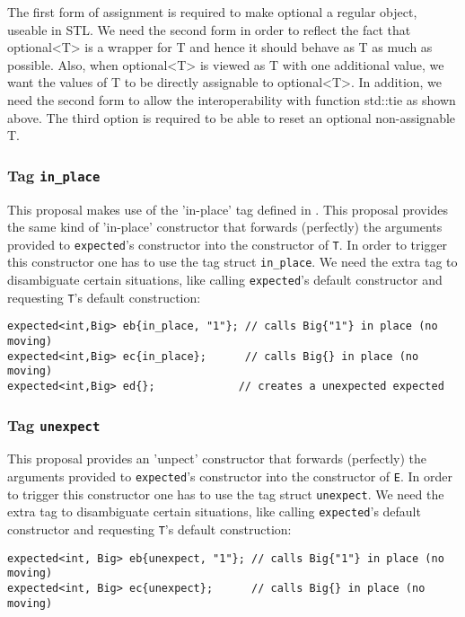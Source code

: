\documentclass[a4paper,10pt]{article}
\newcommand{\cpp}[1]{\lstinline{#1}}
\begin{document}
The first form of assignment is required to make optional a regular object, useable in STL. We need the second form in order to reflect the fact that optional<T> is a wrapper for T and hence it should behave as T as much as possible. Also, when optional<T> is viewed as T with one additional value, we want the values of T to be directly assignable to optional<T>. In addition, we need the second form to allow the interoperability with function std::tie as shown above. The third option is required to be able to reset an optional non-assignable T.

\subsubsection{Tag \cpp{in_place}}

This proposal makes use of the 'in-place' tag defined in \cite{OptionalRev5}. This proposal  provides the same kind of 'in-place' constructor that forwards (perfectly) the arguments provided to \cpp{expected}'s constructor into the constructor of \cpp{T}. In order to trigger this constructor one has to use the tag struct \cpp{in_place}. We need the extra tag to disambiguate certain situations, like calling \cpp{expected}'s default constructor and requesting \cpp{T}'s default construction:

\begin{lstlisting}
expected<int,Big> eb{in_place, "1"}; // calls Big{"1"} in place (no moving)
expected<int,Big> ec{in_place};      // calls Big{} in place (no moving)
expected<int,Big> ed{};             // creates a unexpected expected
\end{lstlisting}


\subsubsection{Tag \cpp{unexpect}}

This proposal provides an 'unpect' constructor that forwards (perfectly) the arguments provided to \cpp{expected}'s constructor into the constructor of \cpp{E}. In order to trigger this constructor one has to use the tag struct \cpp{unexpect}. We need the extra tag to disambiguate certain situations, like calling \cpp{expected}'s default constructor and requesting \cpp{T}'s default construction:

\begin{lstlisting}
expected<int, Big> eb{unexpect, "1"}; // calls Big{"1"} in place (no moving)
expected<int, Big> ec{unexpect};      // calls Big{} in place (no moving)
\end{lstlisting}
\end{document}
